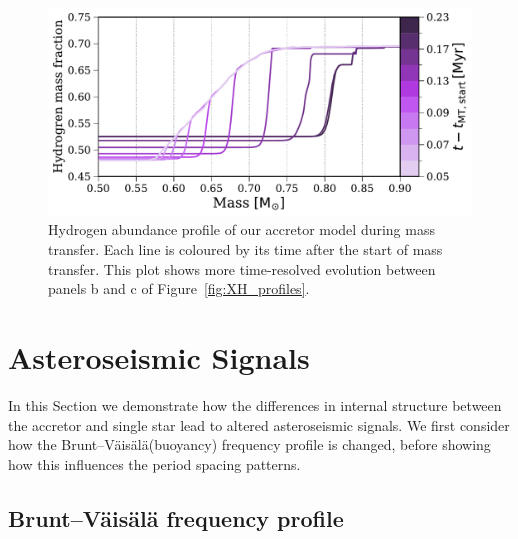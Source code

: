 \documentclass[twocolumn, twocolappendix, oneside]{aastex631}
\renewcommand{\bv}{Brunt–Väisälä\xspace}
\newcommand{\bvf}{Brunt–Väisälä frequency\xspace}
\begin{document}
\begin{figure}[tb]
    \centering
    \includegraphics[width=\columnwidth]{figures/XH_profile_zoom_MT.pdf}
    \caption{Hydrogen abundance profile of our accretor model during mass transfer. Each line is coloured by its time after the start of mass transfer. This plot shows more time-resolved evolution between panels b and c of Figure~\ref{fig:XH_profiles}.}
    \label{fig:X_H_zoom_MT}
\end{figure}

\section{Asteroseismic Signals} \label{sec:results}

In this Section we demonstrate how the differences in internal structure between the accretor and single star lead to altered asteroseismic signals. We first consider how the \bv (buoyancy) frequency profile is changed, before showing how this influences the period spacing patterns.

\subsection{\bvf profile}\label{sec:bvf}
\end{document}
